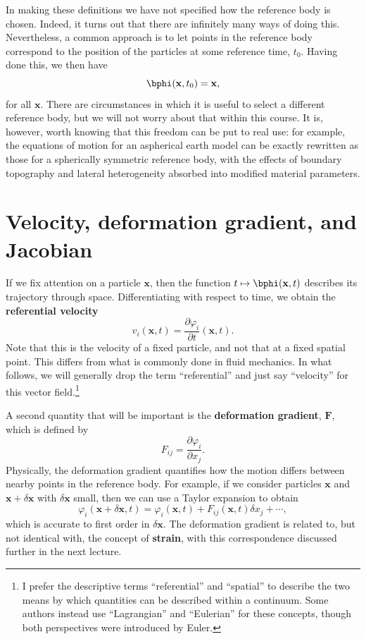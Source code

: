 In making these definitions we have not specified how the reference body is chosen. Indeed, it turns out that there
are infinitely many ways of doing this. Nevertheless, a common approach is to 
let points in the reference body correspond to the position of the particles at some reference time, $t_{0}$. 
Having done this, we then have
\begin{equation}
\bphi(\mathbf{x},t_{0})=\mathbf{x},
\label{eq:1}
\end{equation}
for all $\mathbf{x}$. There are circumstances in which it is useful to select a different reference body, but 
we will not worry about that within this course. It is, however, worth knowing that this freedom can be put to real use: for example, the equations of motion for an 
aspherical earth model can be exactly rewritten as those for a spherically symmetric reference body, with the effects of 
boundary topography and lateral heterogeneity absorbed into modified material parameters. 

\section*{Velocity, deformation gradient, and Jacobian}
If we fix attention on a particle $\mathbf{x}$, then the function $t\mapsto\bphi(\mathbf{x},t)$ describes its 
trajectory through space. Differentiating with respect to time, we obtain the \textbf{referential velocity}
\begin{equation}
v_{i}(\mathbf{x},t)=\frac{\partial\varphi_{i}}{\partial t}(\mathbf{x},t).
\label{eq:2}
\end{equation}
Note that this is the velocity of a fixed particle, and not that at a fixed spatial point. This differs from what is commonly 
done in fluid mechanics. In what follows, we will generally drop the term ``referential'' and just say ``velocity'' for this 
vector field.\footnote{I prefer the descriptive terms ``referential'' and ``spatial'' to describe the two means by which quantities can be 
described within a continuum. Some authors instead use ``Lagrangian'' and ``Eulerian'' for these concepts, though
 both perspectives were introduced by Euler.} 

A second quantity that will be important is the \textbf{deformation gradient}, $\mathbf{F}$, which is defined by
\begin{equation}
F_{ij}=\frac{\partial\varphi_{i}}{\partial x_{j}}.
\label{eq:3}
\end{equation}
Physically, the deformation gradient quantifies how the motion differs between nearby points in the reference body. For 
example, if we consider particles $\mathbf{x}$ and $\mathbf{x}+\delta\mathbf{x}$ with $\delta\mathbf{x}$ small, then we can 
use a Taylor expansion to obtain
\begin{equation}
\varphi_{i}(\mathbf{x}+\delta\mathbf{x},t)=\varphi_{i}(\mathbf{x},t)+F_{ij}(\mathbf{x},t)\delta x_{j}+\cdots,
\label{eq:4}
\end{equation}
which is accurate to first order in $\delta\mathbf{x}$. The deformation gradient is related to, but not identical with,
the concept of \textbf{strain}, with this correspondence discussed further in the next lecture.

